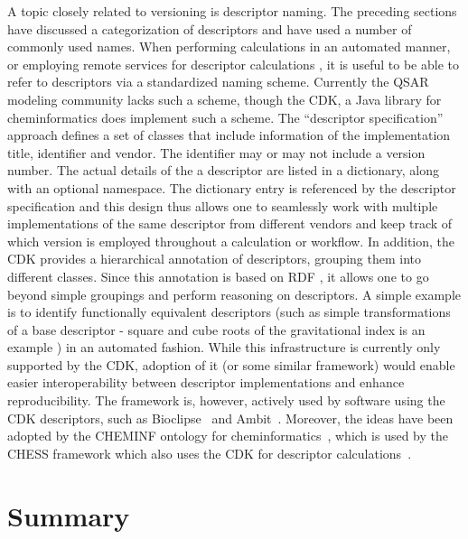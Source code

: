 \documentclass[letterpaper, 12pt]{article}
\begin{document}
A topic closely related to versioning is descriptor naming. The
preceding sections have discussed a categorization of descriptors and
have used a number of commonly used names. When performing
calculations in an automated manner, or employing remote services for
descriptor calculations \cite{Dong:2007aa}, it is useful to be able to
refer to descriptors via a standardized naming scheme. Currently the
QSAR modeling community lacks such a scheme, though the CDK, a Java library for cheminformatics
\cite{Steinbeck:2006aa} does implement such a scheme. The ``descriptor
specification'' approach defines a set of classes that include
information of the implementation title, identifier and vendor. The
identifier may or may not include a version number. The actual details
of the a descriptor are listed in a dictionary, along with an optional
namespace. The dictionary entry is referenced by the descriptor
specification and this design thus allows one to seamlessly work with
multiple implementations of the same descriptor from different vendors
and keep track of which version is employed throughout a calculation
or workflow. In addition, the CDK provides a hierarchical annotation
of descriptors, grouping them into different classes. Since this
annotation is based on RDF \cite{Taylor:2006ab}, it allows one to go
beyond simple groupings and perform reasoning on descriptors. A simple
example is to identify functionally equivalent descriptors (such as
simple transformations of a base descriptor - square and cube roots of
the gravitational index is an example \cite{Wessel:1998ve}) in an
automated fashion. While this infrastructure is currently only
supported by the CDK, adoption of it (or some similar framework) would
enable easier interoperability between descriptor implementations and
enhance reproducibility. The framework is, however, actively used by
software using the CDK descriptors, such as
Bioclipse~\cite{Spjuth2010} and Ambit~\cite{Jelizakova2011}. Moreover,
the ideas have been adopted by the CHEMINF ontology for
cheminformatics~\cite{Hastings2011}, which is used by the CHESS
framework which also uses the CDK for descriptor calculations~\cite{Chepelev2011b}.


\section{Summary}
\label{sec:summary}
\end{document}

